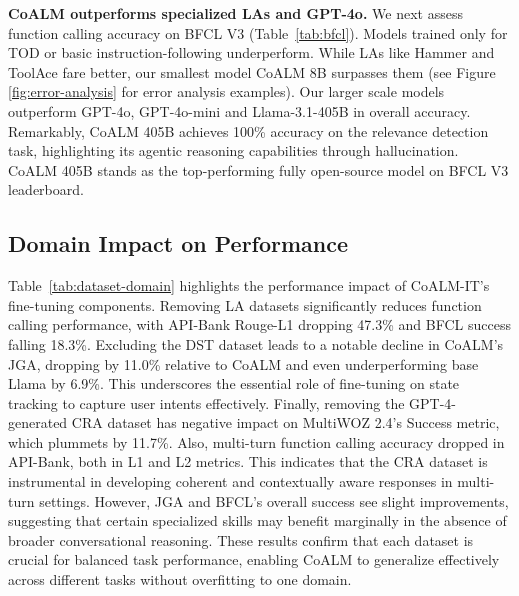 \vspace{3mm}

\noindent\textbf{CoALM outperforms specialized LAs and GPT-4o.} We next assess function calling accuracy on BFCL V3 (Table~\ref{tab:bfcl}). Models trained only for TOD or basic instruction-following underperform. While LAs like Hammer and ToolAce fare better, our smallest model CoALM 8B surpasses them (see Figure \ref{fig:error-analysis} for error analysis examples). Our larger scale models outperform GPT-4o, GPT-4o-mini and Llama-3.1-405B in overall accuracy. Remarkably, CoALM 405B achieves 100\% accuracy on the relevance detection task, highlighting its agentic reasoning capabilities through hallucination. CoALM 405B stands as the top-performing fully open-source model on BFCL V3 leaderboard.

\vspace{3mm}

\subsection{Domain Impact on Performance}
Table~\ref{tab:dataset-domain} highlights the performance impact of CoALM-IT's fine-tuning components. Removing LA datasets significantly reduces function calling performance, with API-Bank Rouge-L1 dropping 47.3\% and BFCL success falling 18.3\%.
Excluding the DST dataset leads to a notable decline in CoALM's JGA, dropping by 11.0\% relative to CoALM and even underperforming base Llama by 6.9\%. This underscores the essential role of fine-tuning on state tracking to capture user intents effectively.
Finally, removing the GPT-4-generated CRA dataset has negative impact on MultiWOZ 2.4's Success metric, which plummets by 11.7\%. Also, multi-turn function calling accuracy dropped in API-Bank, both in L1 and L2 metrics. This indicates that the CRA dataset is instrumental in developing coherent and contextually aware responses in multi-turn settings. However, JGA and BFCL's overall success see slight improvements, suggesting that certain specialized skills may benefit marginally in the absence of broader conversational reasoning.
These results confirm that each dataset is crucial for balanced task performance, enabling CoALM to generalize effectively across different tasks without overfitting to one domain.